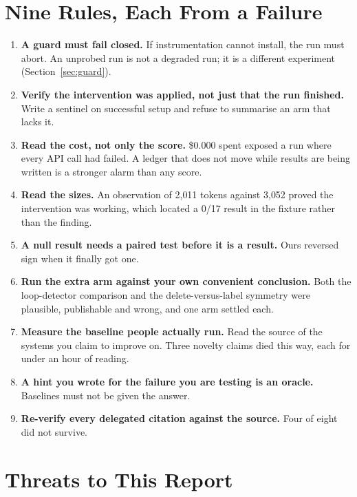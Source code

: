 \documentclass[conference]{IEEEtran}
\begin{document}
\section{Nine Rules, Each From a Failure}

\begin{enumerate}
\item \textbf{A guard must fail closed.} If instrumentation cannot install, the
run must abort. An unprobed run is not a degraded run; it is a different
experiment (Section~\ref{sec:guard}).

\item \textbf{Verify the intervention was applied, not just that the run
finished.} Write a sentinel on successful setup and refuse to summarise an arm
that lacks it.

\item \textbf{Read the cost, not only the score.} \$0.000 spent exposed a
run where every API call had failed. A ledger that does not move while results
are being written is a stronger alarm than any score.

\item \textbf{Read the sizes.} An observation of 2{,}011 tokens against
3{,}052 proved the intervention was working, which located a 0/17 result in
the fixture rather than the finding.

\item \textbf{A null result needs a paired test before it is a result.} Ours
reversed sign when it finally got one.

\item \textbf{Run the extra arm against your own convenient conclusion.} Both
the loop-detector comparison and the delete-versus-label symmetry were
plausible, publishable and wrong, and one arm settled each.

\item \textbf{Measure the baseline people actually run.} Read the source of the
systems you claim to improve on. Three novelty claims died this way, each for
under an hour of reading.

\item \textbf{A hint you wrote for the failure you are testing is an oracle.}
Baselines must not be given the answer.

\item \textbf{Re-verify every delegated citation against the source.} Four of
eight did not survive.
\end{enumerate}

\section{Threats to This Report}
\end{document}
